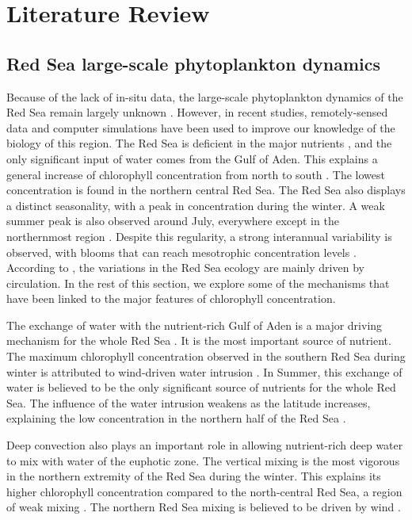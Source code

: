 \chapter{Literature Review}

\section{Red Sea large-scale phytoplankton dynamics}

Because of the lack of in-situ data, the large-scale phytoplankton dynamics of the Red Sea remain largely unknown \cite{Raitsos2013, Triantafyllou2014}. However, in recent studies, remotely-sensed data and computer simulations have been used to improve our knowledge of the biology of this region. The Red Sea is deficient in the major nutrients \cite{Weikert1987}, and the only significant input of water comes from the Gulf of Aden. This explains a general increase of chlorophyll concentration from north to south \cite{Raitsos2013}. The lowest concentration is found in the northern central Red Sea. The Red Sea also displays a distinct seasonality, with a peak in concentration during the winter. A weak summer peak is also observed around July, everywhere except in the northernmost region \cite{Raitsos2013}. Despite this regularity, a strong interannual variability is observed, with blooms that can reach mesotrophic concentration levels \cite{Raitsos2013}. According to \cite{Triantafyllou2014}, the variations in the Red Sea ecology are mainly driven by circulation. In the rest of this section, we explore some of the mechanisms that have been linked to the major features of chlorophyll concentration.


The exchange of water with the nutrient-rich Gulf of Aden is a major driving mechanism for the whole Red Sea \cite{Triantafyllou2014}. It is the most important source of nutrient. The maximum chlorophyll concentration observed in the southern Red Sea during winter is attributed to wind-driven water intrusion \cite{Raitsos2013}. In Summer, this exchange of water is believed to be the only significant source of nutrients for the whole Red Sea. The influence of the water intrusion weakens as the latitude increases, explaining the low concentration in the northern half of the Red Sea \cite{Raitsos2013}.

Deep convection also plays an important role in allowing nutrient-rich deep water to mix with water of the euphotic zone. The vertical mixing is the most vigorous in the northern extremity of the Red Sea during the winter. This explains its higher chlorophyll concentration compared to the north-central Red Sea, a region of weak mixing \cite{Raitsos2013}. The northern Red Sea mixing is believed to be driven by wind \cite{Raitsos2013}.

